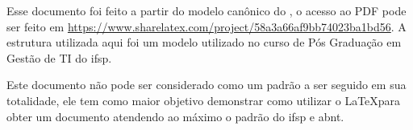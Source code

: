 \newcommand{\urlmodelosimples}{https://www.sharelatex.com/project/58a3a66af9bb74023ba1bd56}

\newcommand{\urlmodelo}{\url{\urlmodelosimples}}

Esse documento foi feito a partir do modelo canônico do \abnTeX, o acesso ao PDF pode ser feito em 
\urlmodelo. A estrutura utilizada aqui foi um modelo utilizado no curso de Pós Graduação em Gestão de TI do \ac{ifsp}.



Este documento não pode ser considerado como um padrão a ser seguido em sua totalidade, ele tem como maior objetivo demonstrar como utilizar o \LaTeX para obter um documento atendendo ao máximo o padrão do \ac{ifsp} e \ac{abnt}.



\noindent\hrulefill



\newpage

